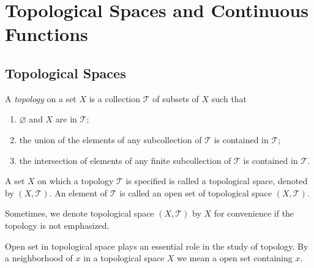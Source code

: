 \chapter{Topological Spaces and Continuous Functions}
\label{chp:topological_spaces}
\section{Topological Spaces}
\begin{defn}
A \emph{topology} on a set $X$ is a collection $\mathcal{T}$ of subsets of 
$X$ such that 
\begin{enumerate}
    \item $\varnothing$ and $X$ are in $\mathcal{T}$; 
    \item the union of the elements of any subcollection of $\mathcal{T}$ is 
    contained in $\mathcal{T}$; 
    \item the intersection of elements of any finite subcollection of 
    $\mathcal{T}$ is contained in $\mathcal{T}$. 
\end{enumerate} 
A set $X$ on which a topology $\mathcal{T}$ is specified is called a 
topological space, denoted by $(X, \mathcal{T})$. 
An element of $\mathcal{T}$ is called an open set of topological space $(X, 
\mathcal{T})$. 
\end{defn}

Sometimes, we denote topological space $(X, \mathcal{T})$ by $X$ for 
convenience if the topology is not emphasized. 

Open set in topological space plays an essential role in the study of 
topology. 
By a neighborhood of $x$ in a topological space $X$ we mean a open set 
containing $x$. 


